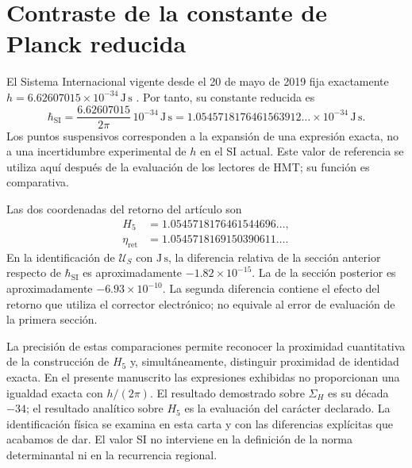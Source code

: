 \section{Contraste de la constante de Planck reducida}
\label{x_reciprocidad:sec:revision-planck-contraste}

El Sistema Internacional vigente desde el 20 de mayo de 2019 fija
exactamente \(h=6.62607015\times10^{-34}\,\mathrm{J\,s}\)
\cite{x_reciprocidad:bipm2018}. Por tanto, su constante reducida es
\[
 \hbar_{\mathrm{SI}}=\frac{6.62607015}{2\pi}\,10^{-34}\,
 \mathrm{J\,s}
 =1.0545718176461563912\ldots\times10^{-34}\,\mathrm{J\,s}.
\]
Los puntos suspensivos corresponden a la expansión de una expresión
exacta, no a una incertidumbre experimental de \(h\) en el SI actual.
Este valor de referencia se utiliza aquí después de la evaluación de
los lectores de HMT; su función es comparativa.

Las dos coordenadas del retorno del artículo son
\begin{align*}
 H_5&=1.0545718176461544696\ldots,\\
 \eta_{\mathrm{ret}}&=1.0545718169150390611\ldots.
\end{align*}
En la identificación de \(\mathcal U_S\) con \(\mathrm{J\,s}\), la
diferencia relativa de la sección anterior respecto de
\(\hbar_{\mathrm{SI}}\) es aproximadamente \(-1.82\times10^{-15}\).
La de la sección posterior es aproximadamente \(-6.93\times10^{-10}\).
La segunda diferencia contiene el efecto del retorno que utiliza el
corrector electrónico; no equivale al error de evaluación de la
primera sección.

La precisión de estas comparaciones permite reconocer la proximidad
cuantitativa de la construcción de \(H_5\) y, simultáneamente, distinguir
proximidad de identidad exacta. En el presente manuscrito las expresiones
exhibidas no proporcionan una igualdad exacta con \(h/(2\pi)\).
El resultado demostrado sobre \(\Sigma_H\) es su década \(-34\);
el resultado analítico sobre \(H_5\) es la evaluación del carácter
declarado. La identificación física se examina en esta carta y con las
diferencias explícitas que acabamos de dar. El valor SI no interviene
en la definición de la norma determinantal ni en la recurrencia regional.


